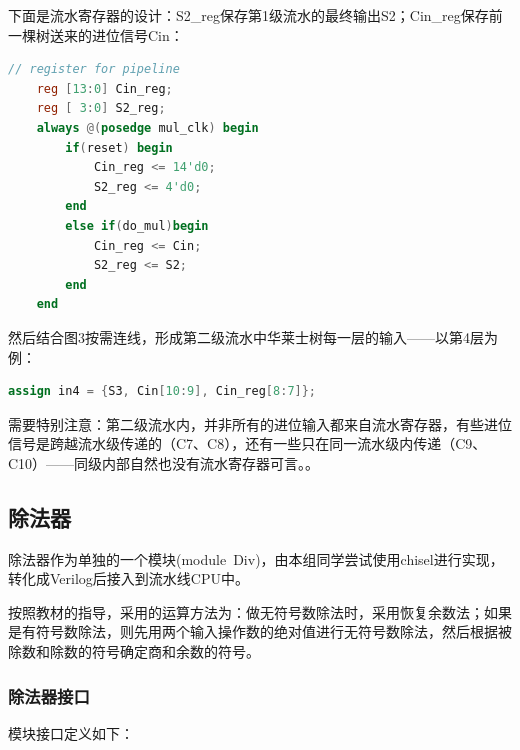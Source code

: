 \documentclass[11pt]{article}
\begin{document}
下面是流水寄存器的设计：S2_reg保存第1级流水的最终输出S2；Cin_reg保存前一棵树送来的进位信号Cin：

\begin{lstlisting}[language=Verilog, caption={华莱士树流水寄存器}]
    // register for pipeline
    reg [13:0] Cin_reg;
    reg [ 3:0] S2_reg;
    always @(posedge mul_clk) begin
        if(reset) begin
            Cin_reg <= 14'd0;
            S2_reg <= 4'd0;
        end 
        else if(do_mul)begin
            Cin_reg <= Cin;
            S2_reg <= S2;
        end
    end
\end{lstlisting}

然后结合图3按需连线，形成第二级流水中华莱士树每一层的输入——以第4层为例：

\begin{lstlisting}[language=Verilog, caption={华莱士树第4层的输入}]
assign in4 = {S3, Cin[10:9], Cin_reg[8:7]};
\end{lstlisting}

需要特别注意：第二级流水内，并非所有的进位输入都来自流水寄存器，有些进位信号是跨越流水级传递的（C7、C8），还有一些只在同一流水级内传递（C9、C10）——同级内部自然也没有流水寄存器可言。。


\subsection{除法器}
除法器作为单独的一个模块(module\  Div)，由本组同学尝试使用chisel进行实现，转化成Verilog后接入到流水线CPU中。

按照教材的指导，采用的运算方法为：做无符号数除法时，采用恢复余数法；如果是有符号数除法，则先用两个输入操作数的绝对值进行无符号数除法，然后根据被除数和除数的符号确定商和余数的符号。

\subsubsection{除法器接口}

模块接口定义如下：
\end{document}
